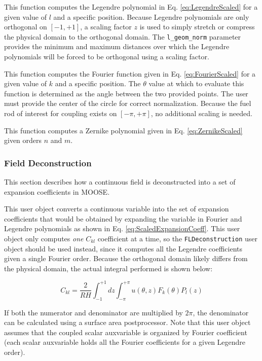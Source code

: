 \documentclass[10pt]{article}
\newcommand{\beq}{\begin{equation}}
\newcommand{\eeq}{\end{equation}}
\newcounter{subsubsubsection}[subsubsection]
\numberwithin{equation}{section} %
\begin{document}
This function computes the Legendre polynomial in Eq. \eqref{eq:LegendreScaled} for a given value of \(l\) and a specific position. Because Legendre polynomials are only orthogonal on \([-1, +1]\), a scaling factor \(z\) is used to simply stretch or compress the physical domain to the orthogonal domain. The {\tt l\_geom\_norm} parameter provides the minimum and maximum distances over which the Legendre polynomials will be forced to be orthogonal using a scaling factor. 

This function computes the Fourier function given in Eq. \eqref{eq:FourierScaled} for a given value of \(k\) and a specific position. The \(\theta\) value at which to evaluate this function is determined as the angle between the two provided points. The user must provide the center of the circle for correct normalization. Because the fuel rod of interest for coupling exists on \([-\pi, +\pi]\), no additional scaling is needed.

This function computes a Zernike polynomial given in Eq. \eqref{eq:ZernikeScaled} given orders \(n\) and \(m\). 

\subsubsection{Field Deconstruction}
This section describes how a continuous field is deconstructed into a set of expansion coefficients in MOOSE.

This user object converts a continuous variable into the set of expansion coefficients that would be obtained by expanding the variable in Fourier and Legendre polynomials as shown in Eq. \eqref{eq:ScaledExpansionCoeff}. This user object only computes {\it one} \(C_{kl}\) coefficient at a time, so the {\tt FLDeconstruction} user object should be used instead, since it computes all the Legendre coefficients given a single Fourier order. Because the orthogonal domain likely differs from the physical domain, the actual integral performed is shown below:

\beq
C_{kl}=\frac{2}{RH}\int_{-1}^{+1}dz\int_{-\pi}^{+\pi}u(\theta, z)F_k(\theta)P_l(z)
\eeq

If both the numerator and denominator are multiplied by \(2\pi\), the denominator can be calculated using a surface area postprocessor. Note that this user object assumes that the coupled scalar auxvariable is organized by Fourier coefficient (each scalar auxvariable holds all the Fourier coefficients for a given Legendre order). 
\end{document}
